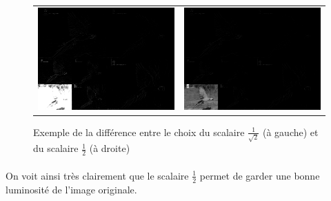 \documentclass[a4paper,10pt]{report}
\theoremstyle{break}
\begin{document}
  \begin{figure}[!h]

    \begin{tabular}{cc}
    
      \includegraphics[width = 0.5 \linewidth]{ara_sqrt2.eps} &
      \includegraphics[width = 0.5 \linewidth]{ara_wt_V1.eps} \\	
      
    \end{tabular}
    
    \caption{Exemple de la diff\'{e}rence entre le choix du scalaire $\frac{1}{\sqrt{2}}$ (\`{a} gauche) 
	et du scalaire $\frac{1}{2}$ (\`{a} droite)}
    
  \end{figure}
  
  \paragraph{} On voit ainsi tr\`{e}s clairement que le scalaire $\frac{1}{2}$ permet de garder une bonne luminosit\'{e} de l'image originale.
\end{document}
